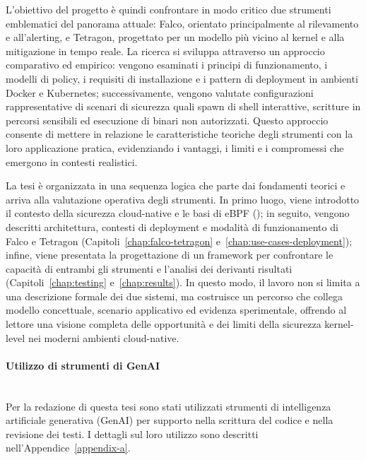 \documentclass[12pt,a4paper,openright,twoside]{book}
\begin{document}
L'obiettivo del progetto è quindi confrontare in modo critico due strumenti emblematici del panorama attuale: Falco, orientato principalmente al rilevamento e all'alerting, e Tetragon, progettato per un modello più vicino al kernel e alla mitigazione in tempo reale. La ricerca si sviluppa attraverso un approccio comparativo ed empirico: vengono esaminati i principi di funzionamento, i modelli di policy, i requisiti di installazione e i pattern di deployment in ambienti Docker e Kubernetes; successivamente, vengono valutate configurazioni rappresentative di scenari di sicurezza quali spawn di shell interattive, scritture in percorsi sensibili ed esecuzione di binari non autorizzati. Questo approccio consente di mettere in relazione le caratteristiche teoriche degli strumenti con la loro applicazione pratica, evidenziando i vantaggi, i limiti e i compromessi che emergono in contesti realistici.

La tesi è organizzata in una sequenza logica che parte dai fondamenti teorici e arriva alla valutazione operativa degli strumenti. In primo luogo, viene introdotto il contesto della sicurezza cloud-native e le basi di eBPF (); in seguito, vengono descritti architettura, contesti di deployment e modalità di funzionamento di Falco e Tetragon (Capitoli~\ref{chap:falco-tetragon} e~\ref{chap:use-cases-deployment}); infine, viene presentata la progettazione di un framework per confrontare le capacità di entrambi gli strumenti e l'analisi dei derivanti risultati (Capitoli~\ref{chap:testing} e~\ref{chap:results}). In questo modo, il lavoro non si limita a una descrizione formale dei due sistemi, ma costruisce un percorso che collega modello concettuale, scenario applicativo ed evidenza sperimentale, offrendo al lettore una visione completa delle opportunità e dei limiti della sicurezza kernel-level nei moderni ambienti cloud-native.

\paragraph{Utilizzo di strumenti di GenAI} \hspace{0pt} \\
Per la redazione di questa tesi sono stati utilizzati strumenti di intelligenza artificiale generativa (GenAI) per supporto nella scrittura del codice e nella revisione dei testi. I dettagli sul loro utilizzo sono descritti nell'Appendice~\ref{appendix-a}.

\end{document}
